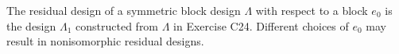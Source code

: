 The residual design of a symmetric block design $\Lambda$ with respect to a block $e_0$ is the design $\Lambda_1$ constructed from $\Lambda$ in Exercise C24. Different choices of $e_0$ may result in nonisomorphic residual designs.
